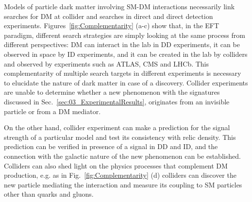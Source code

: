 Models of particle dark matter involving SM-DM interactions necessarily link searches for DM at collider and searches in direct and direct detection experiments. Figures~\ref{fig:Complementarity} (a-c) show that, in the EFT paradigm, different search strategies are simply looking at the same process from different perspectives: DM can interact in the lab in DD experiments, it can be observed in space %
by ID experiments, and it can be created in the lab by colliders and observed by experiments such as ATLAS, CMS and LHCb. This complementarity of multiple search targets in different experiments is necessary to elucidate the nature of dark matter in case of a discovery. Collider experiments are unable to determine whether a new phenomenon with the signatures discussed in Sec.~\ref{sec:03_ExperimentalResults}, originates from an invisible particle or from a DM mediator. 

On the other hand, collider experiment can make a prediction for the signal strength of a particular model and test its consistency with relic density. This prediction can be verified in presence of a signal in DD and ID, and the connection with the galactic nature of the new phenomenon can be established. Colliders can also shed light on the physics processes that complement DM production, e.g. as in Fig.~\ref{fig:Complementarity} (d) colliders can discover the new particle mediating the interaction and measure its coupling to SM particles other than quarks and gluons. %

